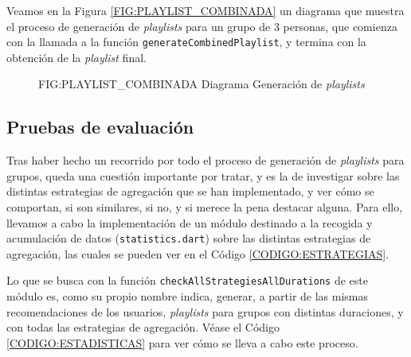 Veamos en la Figura \ref{FIG:PLAYLIST_COMBINADA} un diagrama que muestra el proceso de generación de \textit{playlists} para un grupo de 3 personas, que comienza 
con la llamada a la función \texttt{generateCombinedPlaylist}, y termina con la obtención de la \textit{playlist} final.

\begin{figure}[Diagrama Generación de \textit{playlists}]{FIG:PLAYLIST_COMBINADA}
  {Diagrama Generación de \textit{playlists}}
\end{figure}

\newpage

\subsection{Pruebas de evaluación\label{SEC:PRUEBAS_EVALUACION_IMPLEMENTACION}}

Tras haber hecho un recorrido por todo el proceso de generación de \textit{playlists} para grupos, queda una cuestión importante por tratar, y es
la de investigar sobre las distintas estrategias de agregación que se han implementado, y ver cómo se comportan, si son similares, si no, y si merece la pena 
destacar alguna. Para ello, llevamos a cabo la implementación de un módulo destinado a la recogida y acumulación de datos (\texttt{statistics.dart}) sobre 
las distintas estrategias de agregación, las cuales se pueden ver en el Código \ref{CODIGO:ESTRATEGIAS}.

Lo que se busca con la función \texttt{checkAllStrategiesAllDurations}  de este módulo es, como su propio nombre indica, generar, a partir de las 
mismas recomendaciones de los usuarios, \textit{playlists} para grupos con distintas duraciones, y con todas las estrategias de agregación.
Véase el Código \ref{CODIGO:ESTADISTICAS} para ver cómo se lleva a cabo este proceso.

